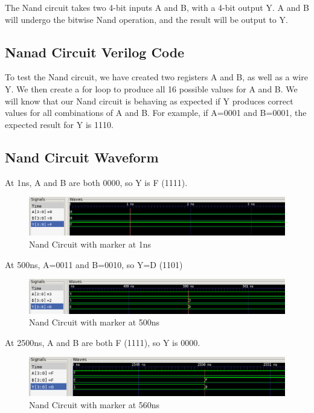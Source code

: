 \documentclass[12pt]{article}
\begin{document}
The Nand circuit takes two 4-bit inputs A and B, with a 4-bit output Y. A and B will undergo the bitwise Nand operation, and the result will be output to Y.
\subsection{Nanad Circuit Verilog Code} 
 

To test the Nand circuit, we have created two registers A and B, as well as a wire Y. We then create a for loop to produce all 16 possible values for A and B. We will know that our Nand circuit is behaving as expected if Y produces correct values for all combinations of A and B. For example, if A=0001 and B=0001, the expected result for Y is 1110. 
 

\subsection{Nand Circuit Waveform} 

At 1ns, A and B are both 0000, so Y is F (1111).
\begin{figure}[H]
 \centering
 \includegraphics[width = 1.0\textwidth]{Nand/nand_wave.png}
 \caption{Nand Circuit with marker at 1ns}
 \label{fig:enter-label} 
\end{figure} 

At 500ns, A=0011 and B=0010, so Y=D (1101) 
 \begin{figure}[H]
 \centering 
\includegraphics[width = 1.0\textwidth]{Nand/nand_wave1.png}
 \caption{Nand Circuit with marker at 500ns}
 \label{fig:enter-label}
 \end{figure}

At 2500ns, A and B are both F (1111), so Y is 0000. 
 \begin{figure}[H]
 \centering 
\includegraphics[width = 1.0\textwidth]{Nand/nand_wave2.png}
 \caption{Nand Circuit with marker at 560ns}
 \label{fig:enter-label}
 \end{figure}
\end{document}
